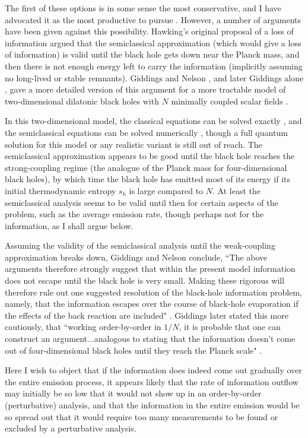 \documentclass[12pt]{article}
\begin{document}
	The first of these options is in some sense the most
conservative,
and I have advocated it as the most productive to pursue
\cite{Pag80}.
However, a number of arguments have been given against this
possibility.  Hawking's original proposal of a loss of information
\cite{Haw76} argued that the semiclassical approximation (which
would give a loss of information) is valid until the black hole gets
down near the Planck mass, and then there is not enough energy left
to carry the information (implicitly assuming no long-lived or stable
remnants).  Giddings and Nelson \cite{GidNel}, and later Giddings
alone \cite{Gid92}, gave a more detailed version of this argument
for a more tractable model of two-dimensional dilatonic black holes
with $N$ minimally coupled scalar fields \cite{CGHS}.

	In this two-dimensional model, the classical equations can be
solved exactly \cite{CGHS}, and the semiclassical equations can be
solved numerically \cite {Pir93}, though a full quantum solution for
this model or any realistic variant is still out of reach.  The
semiclassical
approximation appears to be good until the black hole reaches the
strong-coupling regime (the analogue of the Planck mass for
four-dimensional black holes), by which time the black hole has
emitted most of its energy if its initial thermodynamic entropy
$s_h$ is large compared to $N$.  At least the semiclassical
analysis seems to be valid until then for certain aspects
of the problem, such as the average emission rate,
though perhaps not for the information, as I shall argue below.

	Assuming the validity of the semiclassical analysis until the
weak-coupling approximation breaks down, Giddings and Nelson
\cite{GidNel} conclude, ``The above arguments therefore strongly
suggest that within the present model information does not escape
until the black hole is very small.  Making these rigorous will
therefore
rule out one suggested resolution of the black-hole information
problem, namely, that the information escapes over the course of
black-hole evaporation if the effects of the back reaction are
included"
\cite{GidNel}.  Giddings later stated this more cautiously, that
``working order-by-order in $1/N$, it is probable that
one can construct an argument...analogous to stating that the
information
doesn't come out of four-dimensional black holes until they reach the
Planck
scale" \cite{Gid92}.

	Here I wish to object that if the information does indeed
come out
gradually over the entire emission process, it appears likely that
the rate
of information outflow may initially be so low that it would not show
up
in an order-by-order (perturbative) analysis, and that the
information
in the entire emission would be so spread out that it would require
too
many measurements to be found or excluded by a perturbative analysis.
\end{document}
